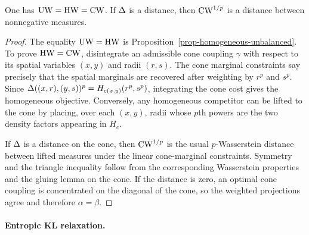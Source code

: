 \begin{thm}\label{thm-cone-unbalanced-ot}
	One has $\operatorname{UW}=\operatorname{HW}=\operatorname{CW}$. If $\Delta$ is a distance, then $\operatorname{CW}^{1/p}$ is a distance between nonnegative measures.
\end{thm}

\begin{proof}
	The equality $\operatorname{UW}=\operatorname{HW}$ is Proposition~\ref{prop-homogeneous-unbalanced}. To prove $\operatorname{HW}=\operatorname{CW}$, disintegrate an admissible cone coupling $\gamma$ with respect to its spatial variables $(x,y)$ and radii $(r,s)$. The cone marginal constraints say precisely that the spatial marginals are recovered after weighting by $r^p$ and $s^p$. Since $\Delta((x,r),(y,s))^p=H_{c(x,y)}(r^p,s^p)$, integrating the cone cost gives the homogeneous objective. Conversely, any homogeneous competitor can be lifted to the cone by placing, over each $(x,y)$, radii whose $p$th powers are the two density factors appearing in $H_c$.

	If $\Delta$ is a distance on the cone, then $\operatorname{CW}^{1/p}$ is the usual $p$-Wasserstein distance between lifted measures under the linear cone-marginal constraints. Symmetry and the triangle inequality follow from the corresponding Wasserstein properties and the gluing lemma on the cone. If the distance is zero, an optimal cone coupling is concentrated on the diagonal of the cone, so the weighted projections agree and therefore $\alpha=\beta$.
\end{proof}

\paragraph{Entropic KL relaxation.}

